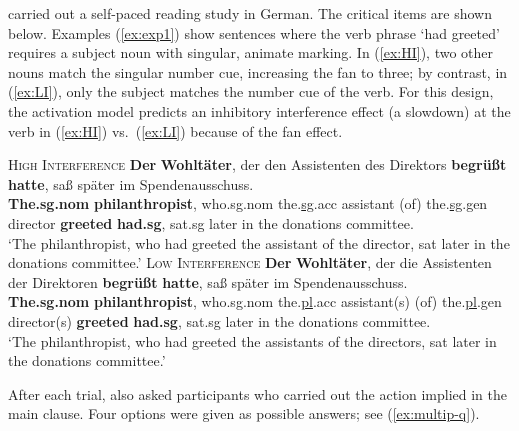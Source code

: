\documentclass{cambridge7A}\usepackage[]{graphicx}\usepackage[]{color}
\begin{document}
\cite{nicenboimexploratory} carried out a self-paced reading study in German. The critical items are shown below. Examples (\ref{ex:exp1}) show  sentences where the verb phrase `had greeted' requires a subject noun with singular, animate marking. In (\ref{ex:HI}), two other nouns match the  singular number cue, increasing the fan to three; by contrast, in (\ref{ex:LI}), only the subject matches the number cue of the verb.  For this design, the activation model predicts an inhibitory interference effect (a slowdown) at the verb in (\ref{ex:HI}) vs.\ (\ref{ex:LI}) because of the fan effect.    

\begin{exe}
    \ex  \label{ex:exp1}
    \begin{xlist}
        \ex \textsc{High Interference} \label{ex:HI}
        \gll \textbf{Der} \textbf{Wohltäter}, der den Assistenten {} des
        Direktors \textbf{begrüßt} \textbf{hatte}, saß später im
        Spendenausschuss.\\
        \textbf{The.sg.nom} \textbf{philanthropist}, who.sg.nom
        the.\underline{sg}.acc assistant (of) the.\underline{sg}.gen director
        \textbf{greeted} \textbf{had.sg}, sat.sg {later} {in the} {donations
        committee}.\\
        \glt ‘The philanthropist, who had greeted the assistant of the director,
        sat later in the donations committee.'
        \ex \textsc{Low Interference} \label{ex:LI}
        \gll \textbf{Der} \textbf{Wohltäter}, der die Assistenten {} der
        Direktoren  \textbf{begrüßt} \textbf{hatte}, saß später im
        Spendenausschuss.\\
        \textbf{The.sg.nom} \textbf{philanthropist}, who.sg.nom
        the.\underline{pl}.acc assistant(s) (of) the.\underline{pl}.gen
        director(s) \textbf{greeted} \textbf{had.sg}, sat.sg {later} {in the}
        {donations committee}.\\
        \glt ‘The philanthropist, who had greeted the assistants of the
        directors, sat later in the donations committee.'
    \end{xlist}
\end{exe}

After each trial, \cite{nicenboimexploratory} also asked participants who carried out the action implied in the main clause. Four options were given  as possible answers; see (\ref{ex:multip-q}).
\end{document}
